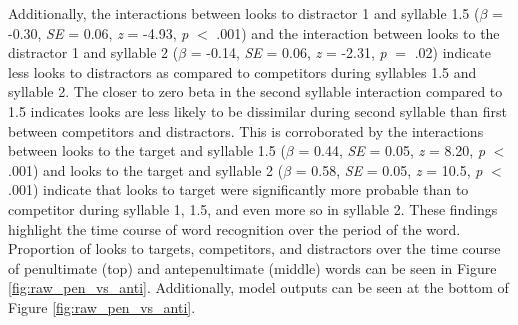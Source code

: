 Additionally, the interactions between looks to distractor 1 and syllable 1.5 ($\beta$ = -0.30, \textit{SE} = 0.06, \textit{z} = -4.93, \textit{p} $<$ .001) and the interaction between looks to the distractor 1 and syllable 2 ($\beta$ = -0.14, \textit{SE} = 0.06, \textit{z} = -2.31, \textit{p} $=$ .02) indicate less looks to distractors as compared to competitors during syllables 1.5 and syllable 2. The closer to zero beta in the second syllable interaction compared to 1.5 indicates looks are less likely to be dissimilar during second syllable than first between competitors and distractors. This is corroborated by the interactions between looks to the target and syllable 1.5 ($\beta$ = 0.44, \textit{SE} = 0.05, \textit{z} = 8.20, \textit{p} $<$ .001) and looks to the target and syllable 2 ($\beta$ = 0.58, \textit{SE} = 0.05, \textit{z} = 10.5, \textit{p} $<$ .001) indicate that looks to target were significantly more probable than to competitor during syllable 1, 1.5, and even more so in syllable 2. These findings highlight the time course of word recognition over the period of the word. Proportion of looks to targets, competitors, and distractors over the time course of penultimate (top) and antepenultimate (middle) words can be seen in Figure \ref{fig:raw_pen_vs_anti}. Additionally, model outputs can be seen at the bottom of Figure \ref{fig:raw_pen_vs_anti}.

